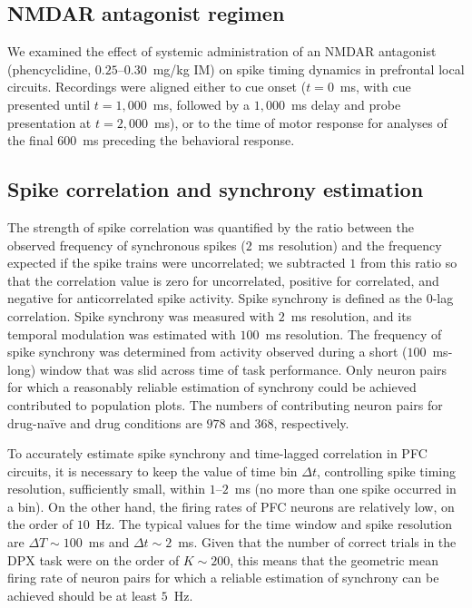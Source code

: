 \documentclass[11pt]{article}
\begin{document}
\subsection{NMDAR antagonist regimen}

We examined the effect of systemic administration of an NMDAR antagonist (phencyclidine, $0.25$--$0.30$~mg/kg IM) on spike timing dynamics in prefrontal local circuits. Recordings were aligned either to cue onset ($t = 0$~ms, with cue presented until $t = 1{,}000$~ms, followed by a $1{,}000$~ms delay and probe presentation at $t = 2{,}000$~ms), or to the time of motor response for analyses of the final $600$~ms preceding the behavioral response.

\subsection{Spike correlation and synchrony estimation}

The strength of spike correlation was quantified by the ratio between the observed frequency of synchronous spikes ($2$~ms resolution) and the frequency expected if the spike trains were uncorrelated; we subtracted $1$ from this ratio so that the correlation value is zero for uncorrelated, positive for correlated, and negative for anticorrelated spike activity. Spike synchrony is defined as the $0$-lag correlation. Spike synchrony was measured with $2$~ms resolution, and its temporal modulation was estimated with $100$~ms resolution. The frequency of spike synchrony was determined from activity observed during a short ($100$~ms-long) window that was slid across time of task performance. Only neuron pairs for which a reasonably reliable estimation of synchrony could be achieved contributed to population plots. The numbers of contributing neuron pairs for drug-na\"ive and drug conditions are $978$ and $368$, respectively.

To accurately estimate spike synchrony and time-lagged correlation in PFC circuits, it is necessary to keep the value of time bin $\Delta t$, controlling spike timing resolution, sufficiently small, within $1$--$2$~ms (no more than one spike occurred in a bin). On the other hand, the firing rates of PFC neurons are relatively low, on the order of $10$~Hz. The typical values for the time window and spike resolution are $\Delta T \sim 100$~ms and $\Delta t \sim 2$~ms. Given that the number of correct trials in the DPX task were on the order of $K \sim 200$, this means that the geometric mean firing rate of neuron pairs for which a reliable estimation of synchrony can be achieved should be at least $5$~Hz.
\end{document}
